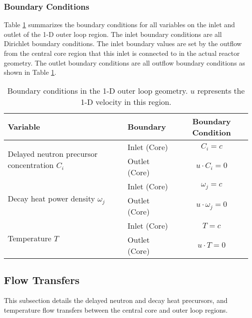 \subsubsection{Boundary Conditions}

Table \ref{table:loopbc} summarizes the boundary conditions for all variables
on the inlet and outlet of the 1-D outer loop region. The inlet boundary
conditions are all Dirichlet boundary conditions. The inlet boundary values
are set by the outflow from the central core region that this inlet is
connected to in the actual reactor geometry. The outlet boundary conditions
are all outflow boundary conditions as shown in Table \ref{table:loopbc}.

\begin{table}[htbp!]
    \small
	\caption{Boundary conditions in the 1-D outer loop geometry. $u$
	represents the 1-D velocity in this region.}
	\centering
	\begin{tabular}{ l l c}
		\toprule
		Variable & Boundary & Boundary Condition \\
        \midrule
        \multirow{2}{*}{Delayed neutron precursor concentration $C_i$} &
        Inlet (Core) & $C_i = c$ \\
        & Outlet (Core) & $u \cdot C_i = 0$ \\
        \midrule
        \multirow{2}{*}{Decay heat power density $\omega_j$} &
        Inlet (Core) & $\omega_j = c$ \\
        & Outlet (Core) & $u \cdot \omega_j = 0$ \\
        \midrule
        \multirow{2}{*}{Temperature $T$} &
        Inlet (Core) & $T = c$ \\
        & Outlet (Core) & $u \cdot T = 0$ \\
		\bottomrule
	\end{tabular}
	\label{table:loopbc}
\end{table}

\subsection{Flow Transfers}

This subsection details the delayed neutron and decay heat precursors, and
temperature flow transfers between the central core and outer loop regions. 


